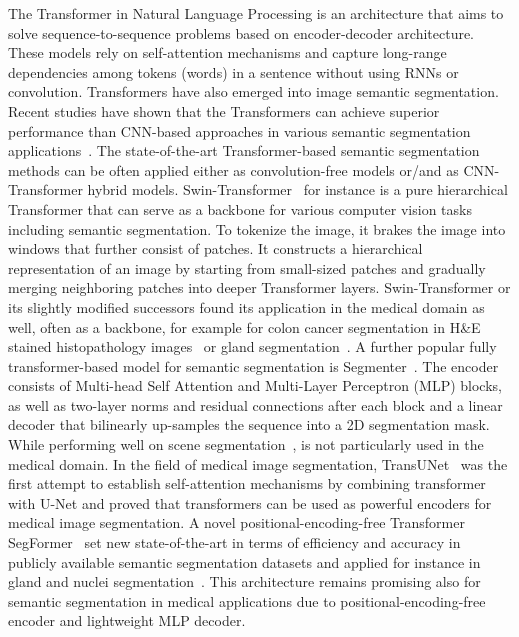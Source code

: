 The Transformer in  Natural Language Processing is an architecture that aims to solve sequence-to-sequence problems based on encoder-decoder architecture. These models rely on self-attention mechanisms and capture long-range dependencies among tokens (words) in a sentence without using RNNs or convolution. Transformers have also emerged into image semantic segmentation. Recent studies have shown that the Transformers can achieve superior performance than CNN-based approaches in various semantic segmentation applications~\cite{nguyen2022evaluating}. The state-of-the-art Transformer-based semantic segmentation methods can be often applied either as convolution-free models or/and as CNN-Transformer hybrid models. Swin-Transformer~\cite{liu2021swin} for instance is a pure hierarchical Transformer that can serve as a  backbone for various computer vision tasks including semantic segmentation. To tokenize the image, it brakes the image into windows that further consist of patches. It constructs a hierarchical representation of an image by starting from small-sized patches and gradually merging neighboring patches into deeper Transformer layers. Swin-Transformer or its slightly modified successors found its application in the medical domain as well, often as a backbone, for example for colon cancer segmentation in H\&E stained histopathology images~\cite{qian2022transformer} or gland segmentation~\cite{lin2022ds}. A further popular fully transformer-based model for semantic segmentation is Segmenter~\cite{strudel2021segmenter}. The encoder consists of Multi-head Self Attention and Multi-Layer Perceptron (MLP) blocks, as well as two-layer norms and residual connections after each block and a linear decoder that bilinearly up-samples the sequence into a 2D segmentation mask. While performing well on scene segmentation~\cite{strudel2021segmenter}, is not particularly used in the medical domain. In the field of medical image segmentation, TransUNet~\cite{chen2021transunet} was the first attempt to establish self-attention mechanisms by combining transformer with U-Net and proved that transformers can be used as powerful encoders for medical image segmentation. A novel positional-encoding-free Transformer SegFormer~\cite{https://doi.org/10.48550/arxiv.2105.15203} set new state-of-the-art in terms of efficiency and accuracy in publicly available semantic segmentation datasets and applied for instance in gland and nuclei segmentation~\cite{lin2022ds}. This architecture remains promising also for semantic segmentation in medical applications due to positional-encoding-free encoder and lightweight MLP decoder.